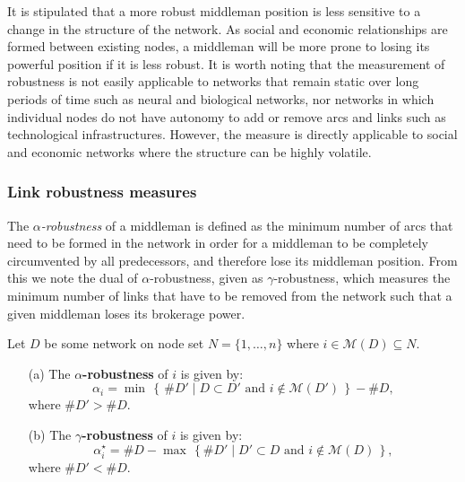 It is stipulated that a more robust middleman position is less sensitive to a change in the structure of the network. As social and economic relationships are formed between existing nodes, a middleman will be more prone to losing its powerful position if it is less robust. It is worth noting that the measurement of robustness is not easily applicable to networks that remain static over long periods of time such as neural and biological networks, nor networks in which individual nodes do not have autonomy to add or remove arcs and links such as technological infrastructures. However, the measure is directly applicable to social and economic networks where the structure can be highly volatile.

\subsubsection{Link robustness measures}

The \emph{$\alpha$-robustness} of a middleman is defined as the minimum number of arcs that need to be formed in the network in order for a middleman to be completely circumvented by all predecessors, and therefore lose its middleman position. From this we note the dual of $\alpha$-robustness, given as $\gamma$-robustness, which measures the minimum number of links that have to be removed from the network such that a given middleman loses its brokerage power.

\begin{definition} \label{robustness}
Let $D$ be some network on node set $N = \{1,\ldots,n\}$ where $i \in \mathcal{M}(D) \subseteq N$. 
\begin{itemize}
\item[(a)] The \textbf{$\alpha$-robustness} of $i$ is given by:
\begin{equation} 
\alpha_{i} = \min \, \left\{ \, \# D' \mid D \subset D' \mbox{ and } i \notin \mathcal{M}(D') \, \right\} - \# D , 
\end{equation}
where $\# D' > \# D$.

\item[(b)] The \textbf{$\gamma$-robustness} of $i$ is given by:
\begin{equation} 
\alpha_{i}^{\star} = \# D - \max \, \left\{ \# D' \mid D' \subset D \mbox{ and } i \notin \mathcal{M}(D) \, \right\} , 
\end{equation} 
where $\# D' < \# D$.
\end{itemize}
\end{definition}

